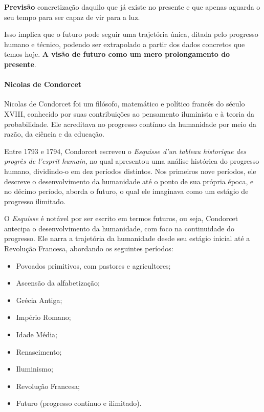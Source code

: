\begin{keypoint}
\textbf{Previsão} concretização daquilo que já existe no presente e que apenas aguarda o seu tempo para ser capaz de vir para a luz.
\end{keypoint}

Isso implica que o futuro pode seguir uma trajetória única, ditada pelo progresso humano e técnico, podendo ser extrapolado a partir dos dados concretos que temos hoje. \textbf{A visão de futuro como um mero prolongamento do presente}.

\paragraph{Nicolas de Condorcet}
Nicolas de Condorcet foi um filósofo, matemático e político francês do século XVIII, conhecido por suas contribuições ao pensamento iluminista e à teoria da probabilidade. Ele acreditava no progresso contínuo da humanidade por meio da razão, da ciência e da educação.

Entre 1793 e 1794, Condorcet escreveu o \textit{Esquisse d'un tableau historique des progrès de l'esprit humain}, no qual apresentou uma análise histórica do progresso humano, dividindo-o em dez períodos distintos. Nos primeiros nove períodos, ele descreve o desenvolvimento da humanidade até o ponto de sua própria época, e no décimo período, aborda o futuro, o qual ele imaginava como um estágio de progresso ilimitado.

O \textit{Esquisse} é notável por ser escrito em termos futuros, ou seja, Condorcet antecipa o desenvolvimento da humanidade, com foco na continuidade do progresso. Ele narra a trajetória da humanidade desde seu estágio inicial até a Revolução Francesa, abordando os seguintes períodos:

\begin{itemize}
    \item Povoados primitivos, com pastores e agricultores;
    \item Ascensão da alfabetização;
    \item Grécia Antiga;
    \item Império Romano;
    \item Idade Média;
    \item Renascimento;
    \item Iluminismo;
    \item Revolução Francesa;
    \item Futuro (progresso contínuo e ilimitado).
\end{itemize}


